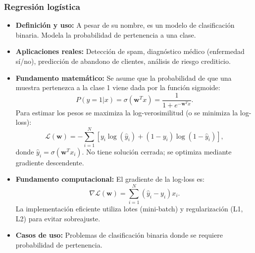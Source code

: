 \documentclass[12pt,a4paper,openany,oneside]{book}
\begin{document}
\subsubsection{Regresión logística}
\begin{itemize}
    \item \textbf{Definición y uso:} A pesar de su nombre, es un modelo de clasificación binaria. Modela la probabilidad de pertenencia a una clase.
    \item \textbf{Aplicaciones reales:} Detección de spam, diagnóstico médico (enfermedad sí/no), predicción de abandono de clientes, análisis de riesgo crediticio.
    \item \textbf{Fundamento matemático:} Se asume que la probabilidad de que una muestra pertenezca a la clase 1 viene dada por la función sigmoide:
    \[
    P(y=1|x) = \sigma(\mathbf{w}^T x) = \frac{1}{1 + e^{-\mathbf{w}^T x}}.
    \]
    Para estimar los pesos se maximiza la log-verosimilitud (o se minimiza la log-loss):
    \[
    \mathcal{L}(\mathbf{w}) = -\sum_{i=1}^N \left[ y_i \log(\hat{y}_i) + (1-y_i) \log(1-\hat{y}_i) \right],
    \]
    donde \(\hat{y}_i = \sigma(\mathbf{w}^T x_i)\). No tiene solución cerrada; se optimiza mediante gradiente descendente.
    \item \textbf{Fundamento computacional:} El gradiente de la log-loss es:
    \[
    \nabla \mathcal{L}(\mathbf{w}) = \sum_{i=1}^N (\hat{y}_i - y_i) x_i.
    \]
    La implementación eficiente utiliza lotes (mini-batch) y regularización (L1, L2) para evitar sobreajuste.
    \item \textbf{Casos de uso:} Problemas de clasificación binaria donde se requiere probabilidad de pertenencia.
\end{itemize}
\end{document}
